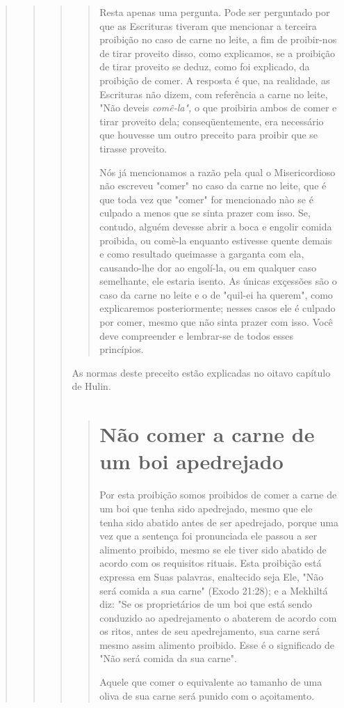 \begin{quote}
\begin{quote}
\begin{quote}
\begin{quote}
Resta apenas uma pergunta. Pode ser perguntado por que as Escritu­ras
tiveram que mencionar a terceira proibição no caso de carne no leite, a
fim de proibir-nos de tirar proveito disso, como explicamos, se a
proibição de tirar proveito se deduz, como foi explicado, da proibição
de comer. A resposta é que, na realidade, as Escrituras não dizem, com
referência a carne no leite, "Não deveis \emph{comê-la",} o que
proibiria ambos de comer e tirar proveito dela; conse­qüentemente, era
necessário que houvesse um outro preceito para proibir que se tirasse
proveito.

Nós já mencionamos a razão pela qual o Misericordioso não escre­veu
"comer" no caso da carne no leite, que é que toda vez que "comer" for
mencionado nào se é culpado a menos que se sinta prazer com isso. Se,
contu­do, alguém devesse abrir a boca e engolir comida proibida, ou
comè-la enquanto estivesse quente demais e como resultado queimasse a
garganta com ela, causando-lhe dor ao engolí-la, ou em qualquer caso
semelhante, ele estaria isento. As únicas exçessões são o caso da carne
no leite e o de "quil-ei ha querem", como explicaremos posteriormente;
nesses casos ele é culpado por comer, mes­mo que não sinta prazer com
isso. Você deve compreender e lembrar-se de to­dos esses princípios.
\end{quote}

As normas deste preceito estão explicadas no oitavo capítulo de Hulin.

\begin{quote}
\section{Não comer a carne de um boi apedrejado}

Por esta proibição somos proibidos de comer a carne de um boi que tenha
sido apedrejado, mesmo que ele tenha sido abatido antes de ser
apedre­jado, porque uma vez que a sentença foi pronunciada ele passou a
ser alimento proibido, mesmo se ele tiver sido abatido de acordo com os
requisitos rituais. Esta proibição está expressa em Suas palavras,
enaltecido seja Ele, "Não será comida a sua carne" (Exodo 21:28); e a
Mekhiltá diz: "Se os proprietários de um boi que está sendo conduzido ao
apedrejamento o abaterem de acordo com os ritos, antes de seu
apedrejamento, sua carne será mesmo assim alimento proi­bido. Esse é o
significado de "Não será comida da sua carne".

Aquele que comer o equivalente ao tamanho de uma oliva de sua carne será
punido com o açoitamento.
\end{quote}


\end{quote}
\end{quote}
\end{quote}
